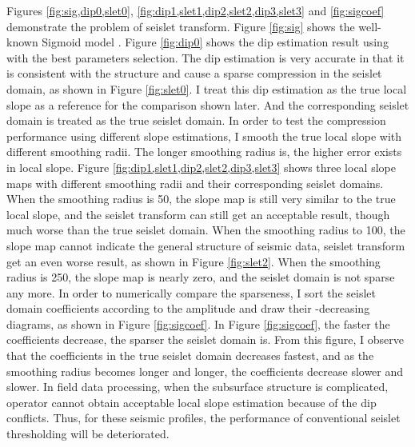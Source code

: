 Figures \ref{fig:sig,dip0,slet0}, \ref{fig:dip1,slet1,dip2,slet2,dip3,slet3} and \ref{fig:sigcoef} demonstrate the  problem of  seislet transform. Figure \ref{fig:sig} shows the well-known Sigmoid model \cite[]{claerbout2010bei}. Figure \ref{fig:dip0} shows the dip estimation result using  with the best parameters selection. The dip estimation is very accurate in that it is consistent with the structure and cause a sparse compression in the seislet domain, as shown in Figure \ref{fig:slet0}. I treat this dip estimation as the true local slope as a reference for the comparison shown later. And the corresponding seislet domain is treated as the true seislet domain. In order to test the compression performance using different slope estimations, I smooth the true local slope with different smoothing radii. The longer smoothing radius is, the higher error exists in  local slope. Figure \ref{fig:dip1,slet1,dip2,slet2,dip3,slet3} shows three local slope maps with different smoothing radii and their corresponding seislet domains. When the smoothing radius is 50, the slope map is still very similar to the true local slope, and the seislet transform can still get an acceptable result, though much worse than the true seislet domain. When the smoothing radius  to 100, the slope map  can\dlo{ }not indicate the general structure of seismic data,  seislet transform get an even worse result, as shown in Figure \ref{fig:slet2}. When the smoothing radius is 250, the slope map is nearly zero, and the seislet domain is not sparse any more. In order to numerically compare the sparseness, I sort the seislet domain coefficients according to the  amplitude and draw their -decreasing diagrams, as shown in Figure \ref{fig:sigcoef}. In Figure \ref{fig:sigcoef}, the faster the coefficients decrease, the sparser the seislet domain is. From this figure, I observe that the coefficients in the true seislet domain decreases fastest, and as the smoothing radius becomes longer and longer, the coefficients decrease slower and slower.  In field data processing, when the subsurface structure is complicated,   operator can\dlo{ }not obtain acceptable local slope estimation because of the dip conflicts. Thus, for these seismic profiles, the performance of conventional seislet thresholding will be deteriorated.

